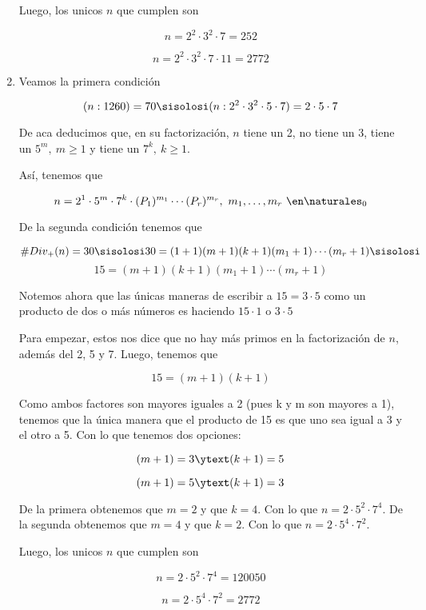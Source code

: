 \begin{enumerate}[label=(\alph*)]
    Luego, los unicos $n$ que cumplen son 

    $$
    n=2^2 \cdot 3^2 \cdot 7 = \boxed{252} 
    $$

    $$
    n=2^2 \cdot 3^2 \cdot 7 \cdot 11 = \boxed{2772}
    $$




    \item Veamos la primera condición

    $$
    (n:1260)=70
    \sisolosi
    (n:2^2 \cdot 3^2 \cdot 5 \cdot 7 )= 2 \cdot 5 \cdot 7
    $$

    De aca deducimos que, en su factorización, $n$ tiene un 2, no tiene un 3, tiene un $5^m, ~ m \geq 1$ y tiene un $7^k, ~ k \geq 1$. \par
    Así, tenemos que

    $$
    n = 2^1 \cdot 5^m \cdot 7^k \cdot (P_1)^{m_1} \cdots (P_r)^{m_r}, ~ m_1, \dots, m_r ~ \en \naturales_0
    $$

    De la segunda condición tenemos que 

    $$
    \#Div_+(n)=30
    \sisolosi
    30 = (1+1)(m+1)(k+1)(m_1+1) \cdots (m_r+1)
    \sisolosi
    $$
    $$
    15 =(m+1)(k+1)(m_1+1) \cdots (m_r+1)
    $$

    Notemos ahora que las únicas maneras de escribir a $15=3 \cdot 5$ como un producto de dos o más números es haciendo $15 \cdot 1$ o $3 \cdot 5$ \par
    Para empezar, estos nos dice que no hay más primos en la factorización de $n$, además del 2, 5 y 7. Luego, tenemos que 

    $$
    15 =(m+1)(k+1)
    $$

    Como ambos factores son mayores iguales a 2 (pues k y m son mayores a 1), tenemos que la única manera que el producto de 15 es que uno sea 
    igual a 3 y el otro a 5. Con lo que tenemos dos opciones:

    $$
    (m+1)= 3 \ytext (k+1)=5
    $$

    $$
    (m+1)= 5 \ytext (k+1)=3
    $$

    De la primera obtenemos que $m= 2$ y que $k=4$. Con lo que $n=2 \cdot 5^2 \cdot 7^4$.
    De la segunda obtenemos que $m= 4$ y que $k=2$. Con lo que $n=2 \cdot 5^4 \cdot 7^2$. \bigskip

    Luego, los unicos $n$ que cumplen son 

    $$
    n=2 \cdot 5^2 \cdot 7^4 = \boxed{120050} 
    $$

    $$
    n=2 \cdot 5^4 \cdot 7^2 = \boxed{2772}
    $$

\end{enumerate}


\begin{aportes}
        \item {}
\end{aportes}